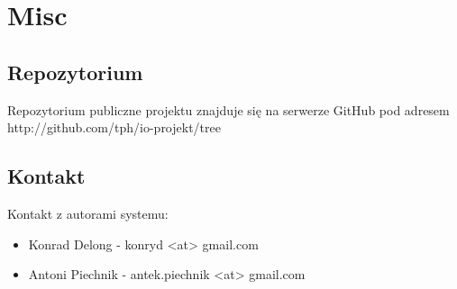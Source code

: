\documentclass[12pt]{article}
\begin{document}
\section{Misc}
\subsection{Repozytorium}
Repozytorium publiczne projektu znajduje się na serwerze GitHub pod adresem
\\http://github.com/tph/io-projekt/tree

\subsection{Kontakt}
Kontakt z autorami systemu:
\begin{itemize}
\item Konrad Delong - konryd <at> gmail.com
\item Antoni Piechnik - antek.piechnik <at> gmail.com
\end{itemize}
\end{document}
